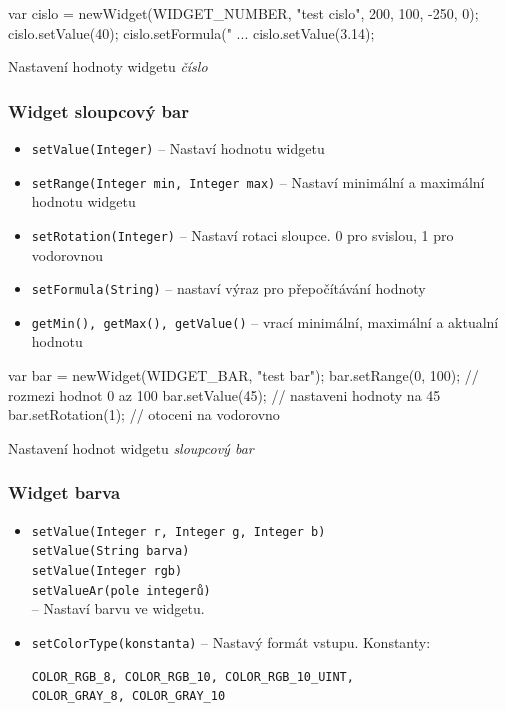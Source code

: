 \documentclass[12pt, a4paper, oneside]{article}
\newcommand{\It}{\textit}  %
\begin{document}
\begin{listing}[H]
\begin{jscode}
var cislo = newWidget(WIDGET_NUMBER,
                "test cislo", 200, 100, -250, 0);
cislo.setValue(40);
cislo.setFormula("%
...
cislo.setValue(3.14);
\end{jscode}
\caption{Nastavení hodnoty widgetu \It{číslo}}
\end{listing}

\subsubsection*{Widget sloupcový bar}
\begin{itemize}
    \item {\color{blue}\verb/setValue(Integer)/} -- Nastaví hodnotu widgetu
    \item {\color{blue}\verb/setRange(Integer min, Integer max)/} -- Nastaví minimální a maximální hodnotu widgetu
    \item {\color{blue}\verb/setRotation(Integer)/} -- Nastaví rotaci sloupce. 0 pro svislou, 1 pro vodorovnou
    \item {\color{blue}\verb/setFormula(String)/} -- nastaví výraz pro přepočítávání hodnoty
    \item {\color{blue}\verb/getMin(), getMax(), getValue()/} -- vrací minimální, maximální a aktualní hodnotu
\end{itemize}

\begin{listing}[H]
\begin{jscode}
var bar = newWidget(WIDGET_BAR, "test bar");
bar.setRange(0, 100); // rozmezi hodnot 0 az 100
bar.setValue(45); // nastaveni hodnoty na 45
bar.setRotation(1); // otoceni na vodorovno
\end{jscode}
\caption{Nastavení hodnot widgetu \It{sloupcový bar}}
\end{listing}

\subsubsection*{Widget barva}
\begin{itemize}
    \item {\color{blue}\verb/setValue(Integer r, Integer g, Integer b)/} \\
    {\color{blue}\verb/setValue(String barva)/} \\
    {\color{blue}\verb/setValue(Integer rgb)/} \\
    {\color{blue}\verb/setValueAr(pole integerů)/} \\
        -- Nastaví barvu ve widgetu.
    \item {\color{blue}\verb/setColorType(konstanta)/} -- Nastavý formát vstupu. Konstanty:
        \begin{verbatim}
COLOR_RGB_8, COLOR_RGB_10, COLOR_RGB_10_UINT,
COLOR_GRAY_8, COLOR_GRAY_10
        \end{verbatim}
\end{itemize}
\end{document}
